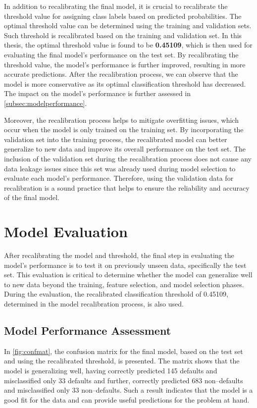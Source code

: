 In addition to recalibrating the final model, it is crucial to recalibrate the threshold value for assigning class labels based on predicted probabilities. The optimal threshold value can be determined using the training and validation sets. Such threshold is recalibrated based on the training and validation set.
In this thesis, the optimal threshold value is found to be \textbf{0.45109}, which is then used for evaluating the final model's performance on the test set.
By recalibrating the threshold value, the model's performance is further improved, resulting in more accurate predictions. After the recalibration process, we can observe that the model is more conservative as its optimal classification threshold has decreased. The impact on the model's performance is further assessed in \autoref{subsec:modelperformance}.

Moreover, the recalibration process helps to mitigate overfitting issues, which occur when the model is only trained on the training set.
By incorporating the validation set into the training process, the recalibrated model can better generalize to new data and improve its overall performance on the test set.
The inclusion of the validation set during the recalibration process does not cause any data leakage issues since this set was already used during model selection to evaluate each model's performance.
Therefore, using the validation data for recalibration is a sound practice that helps to ensure the reliability and accuracy of the final model.

\newpage
\section{Model Evaluation}
\label{sec:modeleval}
After recalibrating the model and threshold, the final step in evaluating the model's performance is to test it on previously unseen data, specifically the test set.
This evaluation is critical to determine whether the model can generalize well to new data beyond the training, feature selection, and model selection phases.
During the evaluation, the recalibrated classification threshold of 0.45109, determined in the model recalibration process, is also used.
\subsection{Model Performance Assessment}
\label{subsec:modelperformance}



In \autoref{fig:confmat}, the confusion matrix for the final model, based on the test set and using the recalibrated threshold, is presented. The matrix shows that the model is generalizing well, having correctly predicted 145 defaults and misclassified only 33 defaults and further, correctly predicted 683 non--defaults and misclassified only 33 non--defaults. Such a result indicates that the model is a good fit for the data and can provide useful predictions for the problem at hand.

